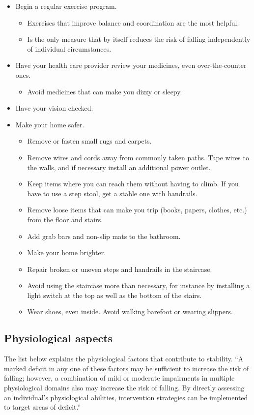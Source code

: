 \begin{itemize}
\item Begin a regular exercise program.
\begin{itemize}
\item Exercises that improve balance and coordination are the most helpful.
\item Is the only measure that by itself reduces the risk of falling independently of individual circumstances. 
\end{itemize}
\item Have your health care provider review your medicines, even over-the-counter ones.
\begin{itemize}
\item Avoid medicines that can make you dizzy or sleepy.
\end{itemize}
\item Have your vision checked.
\item Make your home safer.
\begin{itemize}
\item Remove or fasten small rugs and carpets.
\item Remove wires and cords away from commonly taken paths. Tape wires to the walls, and if necessary install an additional power outlet.
\item Keep items where you can reach them without having to climb. If you have to use a step stool, get a stable one with handrails.
\item Remove loose items that can make you trip (books, papers, clothes, etc.) from the floor and stairs.
\item Add grab bars and non-slip mats to the bathroom.
\item Make your home brighter.
\item Repair broken or uneven steps and handrails in the staircase.
\item Avoid using the staircase more than necessary, for instance by installing a light switch at the top as well as the bottom of the stairs. 
\item Wear shoes, even inside. Avoid walking barefoot or wearing slippers.
\end{itemize}
\end{itemize}

\subsection{Physiological aspects}

The list below explains the physiological factors that contribute to stability. “A marked deficit in any one of these factors may be sufficient to increase the risk of falling; however, a combination of mild or moderate impairments in multiple physiological domains also may increase the risk of falling. By directly assessing an individual's physiological abilities, intervention strategies can be implemented to target areas of deficit.” \cite{LMTassessPrev}

